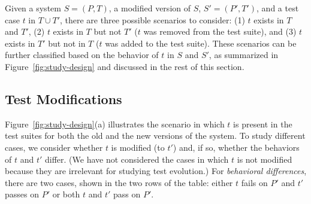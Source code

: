 \documentclass[conference]{IEEEtran}
\begin{document}

Given a system $S = (P, T)$, a modified version of $S$, $S'=(P', T')$,
and a test case $t$ in $T \cup T'$, there are three possible scenarios
to consider: (1) $t$ exists in $T$ and $T'$, (2) $t$ exists in $T$ but
not $T'$ (\ie $t$ was removed from the test suite), and (3) $t$ exists
in $T'$ but not in $T$ (\ie $t$ was added to the test suite). These
scenarios can be further classified based on the behavior of $t$ in
$S$ and $S'$, as summarized in Figure~\ref{fig:study-design} and
discussed in the rest of this section.

\subsection{Test Modifications}
\label{sec:test-mod}

Figure~\ref{fig:study-design}(a) illustrates the scenario in which $t$
is present in the test suites for both the old and the new versions of
the system. To study different cases, we consider whether $t$ is
modified (to $t'$) and, if so, whether the behaviors of $t$ and $t'$
differ. (We have not considered the cases in which $t$ is not modified
because they are irrelevant for studying test evolution.)  For
\textit{behavioral differences}, there are two cases, shown in the two
rows of the table: either $t$ fails on $P'$ and $t'$ passes on $P'$ or
both $t$ and $t'$ pass on $P'$.
\end{document}

